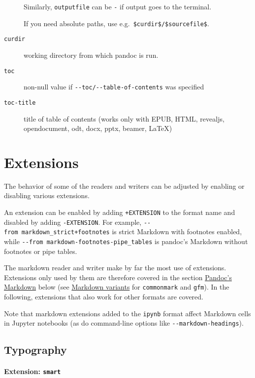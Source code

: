 \begin{description}
Similarly, \texttt{outputfile} can be \texttt{-} if output goes to the
terminal.

If you need absolute paths, use e.g.~\texttt{\$curdir\$/\$sourcefile\$}.
\item[\texttt{curdir}]
working directory from which pandoc is run.
\item[\texttt{toc}]
non-null value if \texttt{-\/-toc/-\/-table-of-contents} was specified
\item[\texttt{toc-title}]
title of table of contents (works only with EPUB, HTML, revealjs,
opendocument, odt, docx, pptx, beamer, LaTeX)
\end{description}

\hypertarget{extensions}{%
\section{Extensions}\label{extensions}}

The behavior of some of the readers and writers can be adjusted by
enabling or disabling various extensions.

An extension can be enabled by adding \texttt{+EXTENSION} to the format
name and disabled by adding \texttt{-EXTENSION}. For example,
\texttt{-\/-from\ markdown\_strict+footnotes} is strict Markdown with
footnotes enabled, while
\texttt{-\/-from\ markdown-footnotes-pipe\_tables} is pandoc's Markdown
without footnotes or pipe tables.

The markdown reader and writer make by far the most use of extensions.
Extensions only used by them are therefore covered in the section
\protect\hyperlink{pandocs-markdown}{Pandoc's Markdown} below (see
\protect\hyperlink{markdown-variants}{Markdown variants} for
\texttt{commonmark} and \texttt{gfm}). In the following, extensions that
also work for other formats are covered.

Note that markdown extensions added to the \texttt{ipynb} format affect
Markdown cells in Jupyter notebooks (as do command-line options like
\texttt{-\/-markdown-headings}).

\hypertarget{typography}{%
\subsection{Typography}\label{typography}}

\hypertarget{extension-smart}{%
\paragraph{\texorpdfstring{Extension:
\texttt{smart}}{Extension: smart}}\label{extension-smart}}

